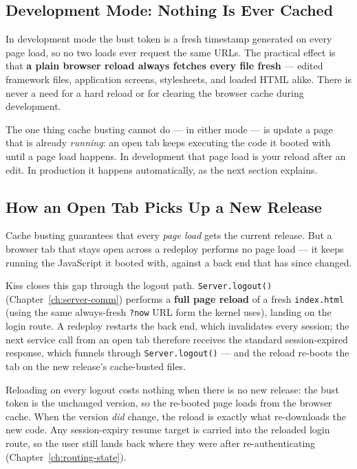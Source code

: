\subsection{Development Mode: Nothing Is Ever Cached}
\label{sec:cache-dev-mode}

In development mode the bust token is a fresh timestamp generated on every page load, so no two loads ever request the same URLs.  The practical effect is that \textbf{a plain browser reload always fetches every file fresh} --- edited framework files, application screens, stylesheets, and loaded HTML alike.  There is never a need for a hard reload or for clearing the browser cache during development.

The one thing cache busting cannot do --- in either mode --- is update a page that is already \emph{running}: an open tab keeps executing the code it booted with until a page load happens.  In development that page load is your reload after an edit.  In production it happens automatically, as the next section explains.

\subsection{How an Open Tab Picks Up a New Release}
\label{sec:cache-release-pickup}

Cache busting guarantees that every \emph{page load} gets the current release.  But a browser tab that stays open across a redeploy performs no page load --- it keeps running the JavaScript it booted with, against a back end that has since changed.

Kiss closes this gap through the logout path.  \texttt{Server.logout()} (Chapter~\ref{ch:server-comm}) performs a \textbf{full page reload} of a fresh \texttt{index.html} (using the same always-fresh \texttt{?now} URL form the kernel uses), landing on the login route.  A redeploy restarts the back end, which invalidates every session; the next service call from an open tab therefore receives the standard session-expired response, which funnels through \texttt{Server.logout()} --- and the reload re-boots the tab on the new release's cache-busted files.

Reloading on every logout costs nothing when there is no new release: the bust token is the unchanged version, so the re-booted page loads from the browser cache.  When the version \emph{did} change, the reload is exactly what re-downloads the new code.  Any session-expiry resume target is carried into the reloaded login route, so the user still lands back where they were after re-authenticating (Chapter~\ref{ch:routing-state}).

